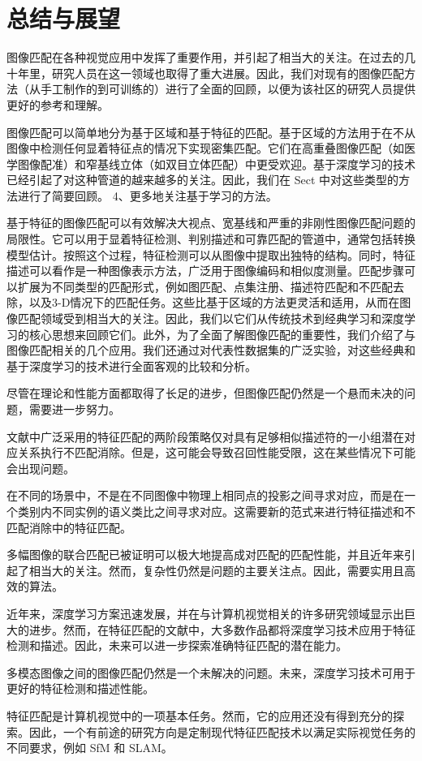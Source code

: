 
\section{总结与展望}

图像匹配在各种视觉应用中发挥了重要作用，并引起了相当大的关注。在过去的几十年里，研究人员在这一领域也取得了重大进展。因此，我们对现有的图像匹配方法（从手工制作的到可训练的）进行了全面的回顾，以便为该社区的研究人员提供更好的参考和理解。

图像匹配可以简单地分为基于区域和基于特征的匹配。基于区域的方法用于在不从图像中检测任何显着特征点的情况下实现密集匹配。它们在高重叠图像匹配（如医学图像配准）和窄基线立体（如双目立体匹配）中更受欢迎。基于深度学习的技术已经引起了对这种管道的越来越多的关注。因此，我们在 Sect 中对这些类型的方法进行了简要回顾。 4、更多地关注基于学习的方法。

基于特征的图像匹配可以有效解决大视点、宽基线和严重的非刚性图像匹配问题的局限性。它可以用于显着特征检测、判别描述和可靠匹配的管道中，通常包括转换模型估计。按照这个过程，特征检测可以从图像中提取出独特的结构。同时，特征描述可以看作是一种图像表示方法，广泛用于图像编码和相似度测量。匹配步骤可以扩展为不同类型的匹配形式，例如图匹配、点集注册、描述符匹配和不匹配去除，以及3-D情况下的匹配任务。这些比基于区域的方法更灵活和适用，从而在图像匹配领域受到相当大的关注。因此，我们以它们从传统技术到经典学习和深度学习的核心思想来回顾它们。此外，为了全面了解图像匹配的重要性，我们介绍了与图像匹配相关的几个应用。我们还通过对代表性数据集的广泛实验，对这些经典和基于深度学习的技术进行全面客观的比较和分析。

尽管在理论和性能方面都取得了长足的进步，但图像匹配仍然是一个悬而未决的问题，需要进一步努力。

文献中广泛采用的特征匹配的两阶段策略仅对具有足够相似描述符的一小组潜在对应关系执行不匹配消除。但是，这可能会导致召回性能受限，这在某些情况下可能会出现问题。

在不同的场景中，不是在不同图像中物理上相同点的投影之间寻求对应，而是在一个类别内不同实例的语义类比之间寻求对应。这需要新的范式来进行特征描述和不匹配消除中的特征匹配。

多幅图像的联合匹配已被证明可以极大地提高成对匹配的匹配性能，并且近年来引起了相当大的关注。然而，复杂性仍然是问题的主要关注点。因此，需要实用且高效的算法。

近年来，深度学习方案迅速发展，并在与计算机视觉相关的许多研究领域显示出巨大的进步。然而，在特征匹配的文献中，大多数作品都将深度学习技术应用于特征检测和描述。因此，未来可以进一步探索准确特征匹配的潜在能力。

多模态图像之间的图像匹配仍然是一个未解决的问题。未来，深度学习技术可用于更好的特征检测和描述性能。

特征匹配是计算机视觉中的一项基本任务。然而，它的应用还没有得到充分的探索。因此，一个有前途的研究方向是定制现代特征匹配技术以满足实际视觉任务的不同要求，例如 SfM 和 SLAM。

\nocite{*}%
